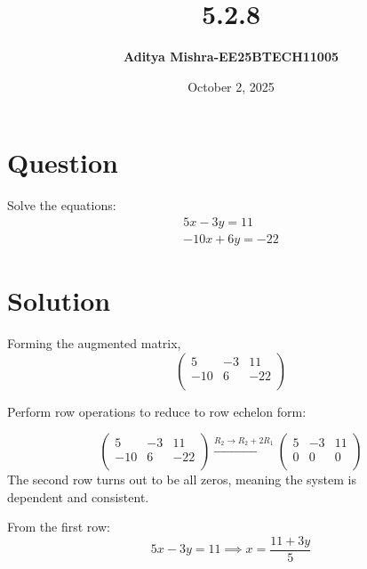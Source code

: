 \documentclass[14pt]{extarticle}
\title{\textbf{5.2.8}}
\author{\textbf{Aditya Mishra-EE25BTECH11005}}
\date{October 2, 2025}
\begin{document}
\maketitle

\section*{Question}
Solve the equations:
\begin{align*}
    5x - 3y = 11 \\
    -10x + 6y = -22
\end{align*}


\section*{Solution}
Forming the augmented matrix,
\[
\left(
\begin{array}{cc|c}
5 & -3 & 11 \\
-10 & 6 & -22 \\
\end{array}
\right)
\]

Perform row operations to reduce to row echelon form:

\[
\left(
\begin{array}{cc|c}
5 & -3 & 11 \\
-10 & 6 & -22 \\
\end{array}
\right)
\xrightarrow{R_2 \rightarrow R_2 + 2R_1}
\left(
\begin{array}{cc|c}
5 & -3 & 11 \\
0 & 0 & 0 \\
\end{array}
\right)
\]
The second row turns out to be all zeros, meaning the system is \\
dependent and consistent.

From the first row:
\[
5x - 3y = 11 \implies x = \frac{11 + 3y}{5}
\]
\end{document}
